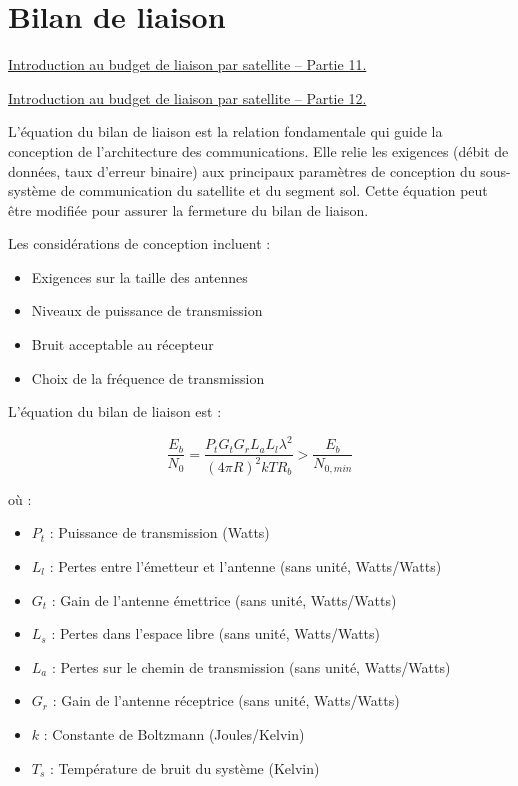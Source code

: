 \section{Bilan de liaison}

\href{https://youtu.be/qFMQgfgPAvg}{Introduction au budget de liaison par satellite – Partie 11.}

\href{https://youtu.be/FTHt-c8hWKw}{Introduction au budget de liaison par satellite – Partie 12.}

L'équation du bilan de liaison est la relation fondamentale qui guide la conception de l'architecture des communications. Elle relie les exigences (débit de données, taux d'erreur binaire) aux principaux paramètres de conception du sous-système de communication du satellite et du segment sol. Cette équation peut être modifiée pour assurer la fermeture du bilan de liaison.

Les considérations de conception incluent :

\begin{itemize}
    \item Exigences sur la taille des antennes
    \item Niveaux de puissance de transmission
    \item Bruit acceptable au récepteur
    \item Choix de la fréquence de transmission
\end{itemize}

L'équation du bilan de liaison est :

\begin{equation}
    \frac{E_b}{N_0} = \frac{P_t G_t G_r L_a L_l \lambda^2}{(4\pi R)^2 k T R_b} > \frac{E_b}{N_{0,min}}
\end{equation}

où :
\begin{itemize}
    \item $P_t$ : Puissance de transmission (Watts)
    \item $L_l$ : Pertes entre l'émetteur et l'antenne (sans unité, Watts/Watts)
    \item $G_t$ : Gain de l'antenne émettrice (sans unité, Watts/Watts)
    \item $L_s$ : Pertes dans l'espace libre (sans unité, Watts/Watts)
    \item $L_a$ : Pertes sur le chemin de transmission (sans unité, Watts/Watts)
    \item $G_r$ : Gain de l'antenne réceptrice (sans unité, Watts/Watts)
    \item $k$ : Constante de Boltzmann (Joules/Kelvin)
    \item $T_s$ : Température de bruit du système (Kelvin)
\end{itemize}

